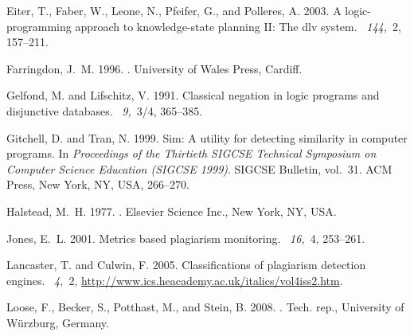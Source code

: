 \documentclass{tlp}
\begin{document}
\begin{thebibliography}{}
{\sc Eiter, T.}, {\sc Faber, W.}, {\sc Leone, N.}, {\sc Pfeifer, G.}, {\sc and}
  {\sc Polleres, A.} 2003.
\newblock A logic-programming approach to knowledge-state planning {II}: The
  {\sc dlv} system.
~{\em 144,\/}~2, 157--211.

{\sc Farringdon, J.~M.} 1996.
.
\newblock University of Wales Press, Cardiff.

{\sc Gelfond, M.} {\sc and} {\sc Lifschitz, V.} 1991.
\newblock Classical negation in logic programs and disjunctive databases.
~{\em 9,\/}~3/4, 365--385.

{\sc Gitchell, D.} {\sc and} {\sc Tran, N.} 1999.
\newblock Sim: {A} utility for detecting similarity in computer programs.
\newblock In {\em Proceedings of the Thirtieth SIGCSE Technical Symposium on
  Computer Science Education {\rm (}SIGCSE 1999{\rm )}}. SIGCSE Bulletin,
  vol.~31. ACM Press, New York, NY, USA, 266--270.

{\sc Halstead, M.~H.} 1977.
.
\newblock Elsevier Science Inc., New York, NY, USA.

{\sc Jones, E.~L.} 2001.
\newblock Metrics based plagiarism monitoring.
~{\em 16,\/}~4,
  253--261.

{\sc Lancaster, T.} {\sc and} {\sc Culwin, F.} 2005.
\newblock Classifications of plagiarism detection engines.
~{\em 4,\/}~2, \url{http://www.ics.heacademy.ac.uk/italics/vol4iss2.htm}.

{\sc Loose, F.}, {\sc Becker, S.}, {\sc Potthast, M.}, {\sc and} {\sc Stein,
  B.} 2008.
.
\newblock Tech. rep., University of W\"{u}rzburg, Germany.


\end{thebibliography}
\end{document}
